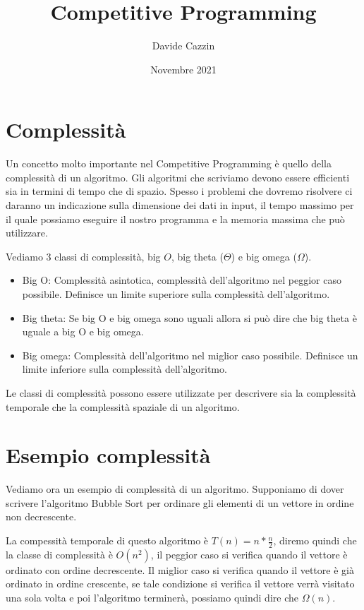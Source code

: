 \documentclass{article}
\title{Competitive Programming}
\author{Davide Cazzin}
\date{Novembre 2021}
\begin{document}
\maketitle

\section{Complessità}

Un concetto molto importante nel Competitive Programming è quello della complessità di un algoritmo. Gli algoritmi che scriviamo devono essere efficienti sia in termini di tempo che di spazio. 
Spesso i problemi che dovremo risolvere ci daranno un indicazione sulla dimensione dei dati in input, il tempo massimo per il quale possiamo eseguire il nostro programma e la memoria massima che può utilizzare.

Vediamo 3 classi di complessità, big $O$, big theta ($\Theta$) e big omega ($\Omega$).
\begin{itemize}
  \item Big O: Complessità asintotica, complessità dell'algoritmo nel peggior caso possibile. Definisce un limite superiore sulla complessità dell'algoritmo.
  \item Big theta: Se big O e big omega sono uguali allora si può dire che big theta è uguale a big O e big omega.
  \item Big omega: Complessità dell'algoritmo nel miglior caso possibile. Definisce un limite inferiore sulla complessità dell'algoritmo.
\end{itemize}

Le classi di complessità possono essere utilizzate per descrivere sia la complessità temporale che la complessità spaziale di un algoritmo.

\section{Esempio complessità}

Vediamo ora un esempio di complessità di un algoritmo. Supponiamo di dover scrivere l'algoritmo Bubble Sort per ordinare gli elementi di un vettore in ordine non decrescente.



La compessità temporale di questo algoritmo è $T(n) = n * \frac{n}{2}$, diremo quindi che la classe di complessità è $O(n^2)$, il peggior caso si verifica quando il vettore è ordinato con ordine decrescente. Il miglior caso si verifica quando il vettore è già ordinato in ordine crescente, se tale condizione si verifica il vettore verrà visitato una sola volta e poi l'algoritmo terminerà, possiamo quindi dire che $\Omega(n)$.
\end{document}
